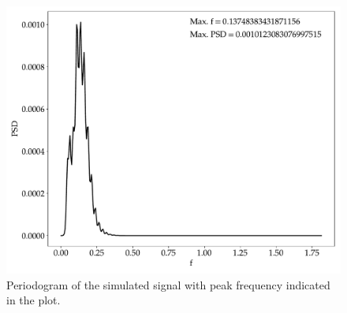 \begin{figure}[h]
  \centering
  \includegraphics[width=\linewidth]{img/wave_scattering/psd_plot}
  \caption{Periodogram of the simulated signal with peak frequency indicated in the plot.}
  \label{fig:multipolar_plots_psd}
\end{figure}